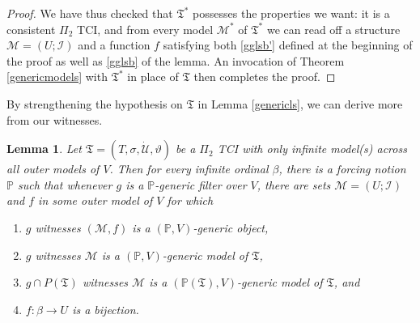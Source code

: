 \documentclass[12pt, twoside]{memoir}
\numberwithin{equation}{section}
\newtheorem{lem}[thm]{Lemma}
\theoremstyle{definition}
\theoremstyle{remark}
\theoremstyle{definition}
\theoremstyle{definition}
\theoremstyle{definition}
\theoremstyle{remark}
\begin{document}
\begin{proof}
We have thus checked that $\mathfrak{T}^*$ possesses the properties we want: it is a consistent $\Pi_2$ TCI, and from every model $\mathcal{M}^*$ of $\mathfrak{T}^*$ we can read off a structure $\mathcal{M} = (U; \mathcal{I})$ and a function $f$ satisfying both \ref{gglsb'} defined at the beginning of the proof as well as \ref{gglsb} of the lemma. An invocation of Theorem \ref{genericmodels} with $\mathfrak{T^*}$ in place of $\mathfrak{T}$ then completes the proof.
\end{proof}

By strengthening the hypothesis on $\mathfrak{T}$ in Lemma \ref{genericls}, we can derive more from our witnesses.

\begin{lem}\label{genericlscor}
Let $\mathfrak{T} = (T, \sigma, \dot{\mathcal{U}}, \vartheta)$ be a $\Pi_2$ TCI with only infinite model(s) across all outer models of $V$. Then for every infinite ordinal $\beta$, there is a forcing notion $\mathbb{P}$ such that whenever $g$ is a $\mathbb{P}$-generic filter over $V$, there are sets $\mathcal{M} = (U; \mathcal{I})$ and $f$ in some outer model of $V$ for which  
\begin{enumerate}[label=(\alph*)]
    \item $g$ witnesses $(\mathcal{M}, f)$ is a $(\mathbb{P}, V)$-generic object, 
    \item $g$ witnesses $\mathcal{M}$ is a $(\mathbb{P}, V)$-generic model of $\mathfrak{T}$,
    \item $g \cap P(\mathfrak{T})$ witnesses $\mathcal{M}$ is a $(\mathbb{P}(\mathfrak{T}), V)$-generic model of $\mathfrak{T}$, and
    \item $f : \beta \longrightarrow U$ is a bijection.
\end{enumerate}
\end{lem}
\end{document}
